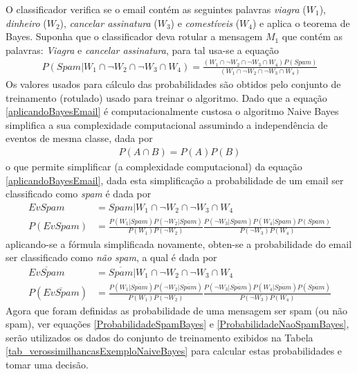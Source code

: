 O classificador verifica se o email contém as seguintes palavras \emph{viagra} (\(W_{1}\)), \emph{dinheiro} (\(W_{2}\)), \emph{cancelar assinatura} (\(W_{3}\)) e \emph{comestíveis} (\(W_{4}\)) e aplica o teorema de Bayes. Suponha que o classificador deva rotular a mensagem \(M_{1}\) que contém as palavras: \emph{Viagra} e \emph{cancelar assinatura}, para tal usa-se a equação
\begin{align}
P(Spam|W_{1} \cap \neg W_{2} \cap \neg W_{3} \cap W_{4}) = \frac{(W_{1} \cap \neg W_{2} \cap \neg W_{3} \cap W_{4})P(Spam)}{(W_{1} \cap \neg W_{2} \cap \neg W_{3} \cap W_{4})} \label{aplicandoBayesEmail}
\end{align}
Os valores usados para cálculo das probabilidades são obtidos pelo conjunto de treinamento (rotulado) usado para treinar o algoritmo. Dado que a equação \eqref{aplicandoBayesEmail} é computacionalmente custosa o algoritmo Naive Bayes simplifica a sua complexidade computacional assumindo a independência de eventos de mesma classe, dada por
\begin{align}
P(A \cap B) = P(A)P(B)
\end{align}
o que permite simplificar (a complexidade computacional) da equação \eqref{aplicandoBayesEmail}, dada esta simplificação a probabilidade de um email ser classificado como \emph{spam} é dada por
\begin{align}
EvSpam &= Spam|W_{1} \cap \neg W_{2} \cap \neg W_{3} \cap W_{4} \\
P(EvSpam) &= \frac{P(W_{1}|Spam) P(\neg W_{2}|Spam) }{P(W_{1}) P(\neg W_{2})} \frac{P(\neg W_{3}|Spam) P(W_{4}|Spam) P(Spam)}{P(\neg W_{3}) P(W_{4})} \label{ProbabilidadeSpamBayes}
\end{align}
aplicando-se a fórmula simplificada novamente, obten-se a probabilidade do email ser classificado como \emph{não spam}, a qual é dada por
\begin{align}
\overline{EvSpam} &= \overline{Spam}|W_{1} \cap \neg W_{2} \cap \neg W_{3} \cap W_{4} \\
P(\overline{EvSpam}) &= \frac{P(W_{1}|\overline{Spam}) P(\neg W_{2}|\overline{Spam}) }{P(W_{1})  P(\neg W_{2})} \frac{P(\neg W_{3}|\overline{Spam}) P(W_{4}|\overline{Spam}) P(\overline{Spam})}{P(\neg W_{3}) P(W_{4})} \label{ProbabilidadeNaoSpamBayes}
\end{align}
Agora que foram definidas as probabilidade de uma mensagem ser spam (ou não spam), ver equações \eqref{ProbabilidadeSpamBayes} e \eqref{ProbabilidadeNaoSpamBayes}, serão utilizados os dados do conjunto de treinamento exibidos na Tabela \ref{tab_verossimilhancasExemploNaiveBayes} para calcular estas probabilidades e tomar uma decisão.
